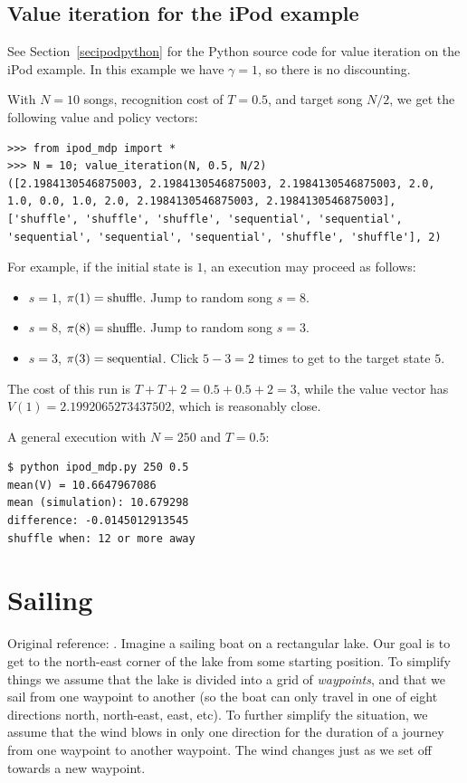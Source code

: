 \documentclass[12pt,amstags,fleqn]{article}
\theoremstyle{plain}
\theoremstyle{definition}
\theoremstyle{definition}
\begin{document}
\subsection{Value iteration for the iPod example}

See Section~\ref{secipodpython} for the Python source code for value
iteration on the iPod example. In this example we have $\gamma = 1$, so
there is no discounting.

With $N = 10$ songs, recognition cost of $T = 0.5$, and target song
$N/2$, we get the following value and policy vectors:

\begin{Verbatim}
>>> from ipod_mdp import *
>>> N = 10; value_iteration(N, 0.5, N/2)
([2.1984130546875003, 2.1984130546875003, 2.1984130546875003, 2.0, 
1.0, 0.0, 1.0, 2.0, 2.1984130546875003, 2.1984130546875003], 
['shuffle', 'shuffle', 'shuffle', 'sequential', 'sequential', 
'sequential', 'sequential', 'sequential', 'shuffle', 'shuffle'], 2)
\end{Verbatim}

For example, if the initial state is $1$, an execution may proceed as
follows:

\begin{itemize}

\item $s = 1$, $\pi(1) = \textnormal{shuffle}$. Jump to random song $s = 8$.
\item $s = 8$, $\pi(8) = \textnormal{shuffle}$. Jump to random song $s = 3$.
\item $s = 3$, $\pi(3) = \textnormal{sequential}$. Click $5-3 = 2$ times
to get to the target state $5$. 
\end{itemize}
The cost of this run is $T + T + 2 = 0.5 + 0.5 + 2 = 3$, while the value
vector has $V(1) = 2.1992065273437502$, which is reasonably close. 

A general execution with $N = 250$ and $T = 0.5$:

\begin{Verbatim}
$ python ipod_mdp.py 250 0.5
mean(V) = 10.6647967086
mean (simulation): 10.679298
difference: -0.0145012913545
shuffle when: 12 or more away
\end{Verbatim}

\section{Sailing}

Original reference: \cite{sail}. Imagine a sailing boat on a
rectangular lake. Our goal is to get to the north-east corner of the
lake from some starting position. To simplify things we assume that
the lake is divided into a grid of {\em waypoints}, and that we sail
from one waypoint to another (so the boat can only travel in one of
eight directions north, north-east, east, etc). To further simplify
the situation, we assume that the wind blows in only one direction for
the duration of a journey from one waypoint to another waypoint. The
wind changes just as we set off towards a new waypoint.
\end{document}
